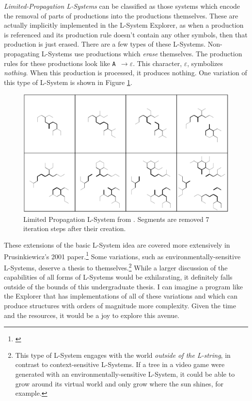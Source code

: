 \documentclass[12pt,twoside]{reedthesis}
\newcommand{\code}[1]{\texttt{#1}}
\begin{document}
	\textit{Limited-Propagation L-Systems} can be classified as those systems which encode the removal of parts of productions into the productions themselves. These are actually implicitly implemented in the L-System Explorer, as when a production is referenced and its production rule doesn't contain any other symbols, then that production is just erased. There are a few types of these L-Systems. Non-propagating L-Systems use productions which \textit{erase} themselves. The production rules for these productions look like \code{A $\rightarrow \varepsilon$}. This character, $\varepsilon$, symbolizes \textit{nothing}. When this production is processed, it produces nothing. One variation of this type of L-System is shown in Figure \ref{LimitedPropagation}.
	
	
	\begin{figure}[h]
	\centering
	\includegraphics[width=0.8\linewidth]{Images/LimitedPropagation}
	\caption[Limited Propagation L-System from \cite{LSystems2001}]{Limited Propagation L-System from \cite{LSystems2001}. Segments are removed 7 iteration steps after their creation.}
	\label{LimitedPropagation}
	\end{figure}
	
	These extensions of the basic L-System idea are covered more extensively in Prusinkiewicz's 2001 paper.\footnote{\cite{LSystems2001}} Some variations, such as environmentally-sensitive L-Systems, deserve a thesis to themselves.\footnote{This type of L-System engages with the world \textit{outside of the L-string}, in contrast to context-sensitive L-Systems. If a tree in a video game were generated with an environmentally-sensitive L-System, it could be able to grow around its virtual world and only grow where the sun shines, for example.} While a larger discussion of the capabilities of all forms of L-Systems would be exhilarating, it definitely falls outside of the bounds of this undergraduate thesis. I can imagine a program like the Explorer that has implementations of all of these variations and which can produce structures with orders of magnitude more complexity. Given the time and the resources, it would be a joy to explore this avenue.
	
\end{document}
